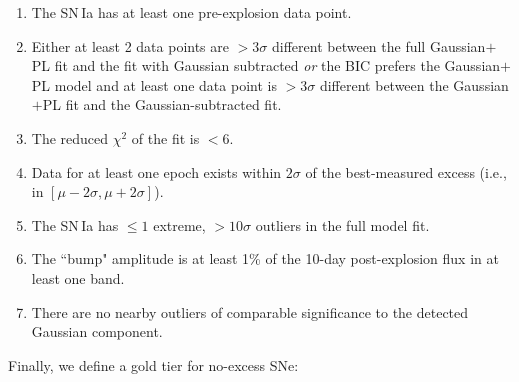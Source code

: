 \documentclass[twocolumn,twocolappendix, linenumbers]{aastex631} %
\begin{document}
\begin{enumerate}
    \item The SN\,Ia has at least one pre-explosion data point.
    \item Either at least 2 data points are $>3\sigma$ different between the full Gaussian$+$PL fit and the fit with Gaussian subtracted {\it or} the BIC prefers the Gaussian$+$PL model and at least one data point is $>3\sigma$ different between the Gaussian$+$PL fit and the Gaussian-subtracted fit.
    \item The reduced $\chi^2$ of the fit is $< 6$.
    \item Data for at least one epoch exists within $2\sigma$ of the best-measured excess (i.e., in $[\mu - 2\sigma, \mu + 2\sigma]$).
    \item The SN\,Ia has $\leq 1$ extreme, $>10\sigma$ outliers in the full model fit.
    \item The ``bump" amplitude is at least 1\% of the 10-day post-explosion flux in at least one band.
    \item There are no nearby outliers of comparable significance to the detected Gaussian component.
\end{enumerate}

Finally, we define a gold tier for no-excess SNe:
\end{document}
